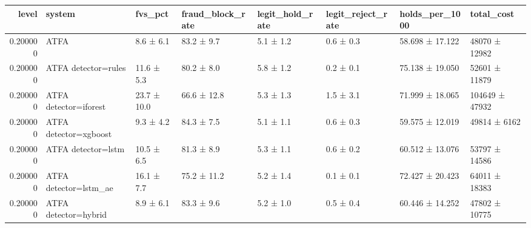 \begin{tabular}{rlllllll}
\toprule
level & system & fvs\_pct & fraud\_block\_rate & legit\_hold\_rate & legit\_reject\_rate & holds\_per\_1000 & total\_cost \\
\midrule
0.200000 & ATFA & 8.6 ± 6.1 & 83.2 ± 9.7 & 5.1 ± 1.2 & 0.6 ± 0.3 & 58.698 ± 17.122 & 48070 ± 12982 \\
0.200000 & ATFA detector=rules & 11.6 ± 5.3 & 80.2 ± 8.0 & 5.8 ± 1.2 & 0.2 ± 0.1 & 75.138 ± 19.050 & 52601 ± 11879 \\
0.200000 & ATFA detector=iforest & 23.7 ± 10.0 & 66.6 ± 12.8 & 5.3 ± 1.3 & 1.5 ± 3.1 & 71.999 ± 18.065 & 104649 ± 47932 \\
0.200000 & ATFA detector=xgboost & 9.3 ± 4.2 & 84.3 ± 7.5 & 5.1 ± 1.1 & 0.6 ± 0.3 & 59.575 ± 12.019 & 49814 ± 6162 \\
0.200000 & ATFA detector=lstm & 10.5 ± 6.5 & 81.3 ± 8.9 & 5.3 ± 1.1 & 0.6 ± 0.2 & 60.512 ± 13.076 & 53797 ± 14586 \\
0.200000 & ATFA detector=lstm\_ae & 16.1 ± 7.7 & 75.2 ± 11.2 & 5.2 ± 1.4 & 0.1 ± 0.1 & 72.427 ± 20.423 & 64011 ± 18383 \\
0.200000 & ATFA detector=hybrid & 8.9 ± 6.1 & 83.3 ± 9.6 & 5.2 ± 1.0 & 0.5 ± 0.4 & 60.446 ± 14.252 & 47802 ± 10775 \\
\bottomrule
\end{tabular}
